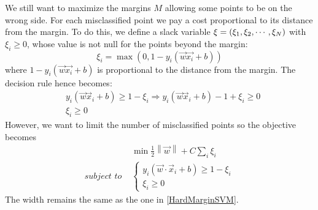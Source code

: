 \documentclass[12pt, letterpaper]{article}
\theoremstyle{definition}
\DeclarePairedDelimiter\autobracket{(}{)}
\newcommand{\br}[1]{\autobracket*{#1}}
\newcommand\norm[1]{\left\lVert#1\right\rVert}
\begin{document}
We still want to maximize the margins $M$ allowing some points to be on the wrong side. For each misclassified point we pay a cost proportional to its distance from the margin. To do this, we define a slack variable $\xi=\br{\xi_1, \xi_2, \cdots, \xi_N}$ with $\xi_i\ge 0$, whose value is not null for the points beyond the margin:
\begin{equation}
\xi_i = \max \left(0, 1-y_i(\vec{w}\vec{x_i}+b)\right)
\end{equation}
where $1-y_i(\vec{w}\vec{x_i}+b)$ is proportional to the distance from the margin.	
The decision rule hence becomes:
\begin{equation}
\begin{aligned}
& y_i \left( \vec{w} \vec{x}_i + b\right) \ge 1 - \xi_i \Rightarrow y_i \left( \vec{w} \vec{x}_i + b\right) - 1+ \xi_i  \ge 0 \\
& \xi_i \ge 0
\end{aligned}
\end{equation}
However, we want to limit the number of misclassified points so the objective becomes
\begin{equation}
\begin{aligned}
&\min \frac{1}{2} \norm{\vec{w}} + C \sum_i \xi_i\\
\textit{subject to }&\left\{
		\begin{array}{ll}
				y_i(\vec{w} \cdot \vec{x}_i+b) \ge 1-\xi_i\\ 
 				\xi_i \ge 0
		\end{array} 
\right.
\end{aligned}
\end{equation}
The width remains the same as the one in \autoref{HardMarginSVM}. 

\iffalse
\end{document}

